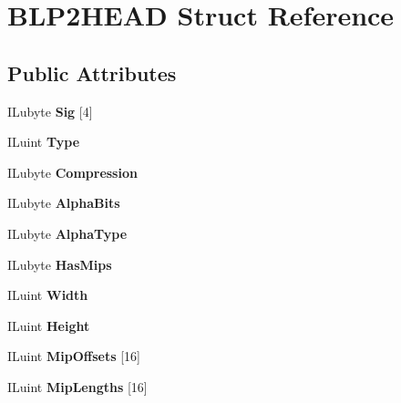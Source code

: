 \hypertarget{structBLP2HEAD}{}\section{B\+L\+P2\+H\+E\+AD Struct Reference}
\label{structBLP2HEAD}
\subsection*{Public Attributes}
\begin{DoxyCompactItemize}
\item 
\mbox{\label{structBLP2HEAD_ab3de3c33d3e3fb1dbb2df2a58145783e}} 
I\+Lubyte {\bfseries Sig} \mbox{[}4\mbox{]}
\item 
\mbox{\label{structBLP2HEAD_aa00fc1a718071d90b6d754c72eee642d}} 
I\+Luint {\bfseries Type}
\item 
\mbox{\label{structBLP2HEAD_ad6b6a56283e16ecedbe5156d1253d898}} 
I\+Lubyte {\bfseries Compression}
\item 
\mbox{\label{structBLP2HEAD_a9ef13881e74229d0e70e1f4aae44658c}} 
I\+Lubyte {\bfseries Alpha\+Bits}
\item 
\mbox{\label{structBLP2HEAD_a5505e0a94d6dbabbad1ec5285e919aee}} 
I\+Lubyte {\bfseries Alpha\+Type}
\item 
\mbox{\label{structBLP2HEAD_aef87725282ac5fe593180f534d7f04f1}} 
I\+Lubyte {\bfseries Has\+Mips}
\item 
\mbox{\label{structBLP2HEAD_abb241e1828c6789906f347ee7a141e6b}} 
I\+Luint {\bfseries Width}
\item 
\mbox{\label{structBLP2HEAD_a3f54ec16ee753391bfff115619061e24}} 
I\+Luint {\bfseries Height}
\item 
\mbox{\label{structBLP2HEAD_a0afd214abae737a9270eb09021b4f208}} 
I\+Luint {\bfseries Mip\+Offsets} \mbox{[}16\mbox{]}
\item 
\mbox{\label{structBLP2HEAD_a0d13a0775c1b9b2212863de195b23a0a}} 
I\+Luint {\bfseries Mip\+Lengths} \mbox{[}16\mbox{]}
\end{DoxyCompactItemize}


